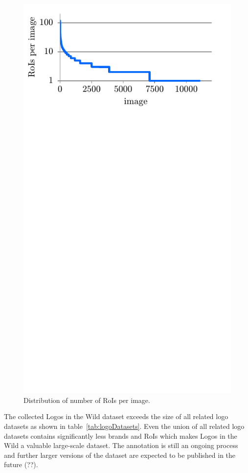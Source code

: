 \documentclass[a4paper,twoside]{article}
\begin{document}
\begin{figure}%
\centering%
\includegraphics[width=\linewidth, trim=0cm 11cm 0cm 0cm, clip]{img/logoDistribution.pdf}%
\caption{Distribution of number of RoIs per image.}%
\label{fig:logoDistribution}
\end{figure}%

The collected Logos in the Wild dataset exceeds the size of all related logo datasets as shown in table~\ref{tab:logoDatasets}. Even the union of all related logo datasets contains significantly less brands and RoIs which makes Logos in the Wild a valuable large-scale dataset.
The annotation is still an ongoing process and further larger versions of the dataset are expected to be published in the future (??).
%
\end{document}
